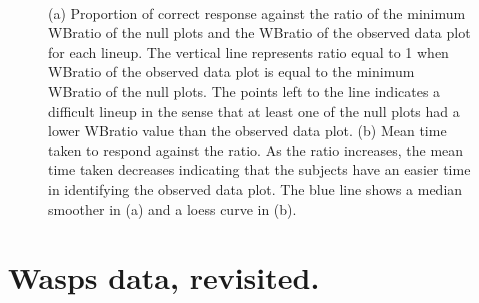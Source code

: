 \begin{figure}[htbp]
\centering
\mbox{\quad
{}}
\caption{(a) Proportion of correct response against the ratio of the minimum WBratio of the null plots and the WBratio of the observed data plot for each lineup. The vertical line represents ratio equal to 1 when WBratio of the observed data plot is equal to the minimum WBratio of the null plots. The points left to the line indicates a difficult lineup in the sense that at least one of the null plots had a lower WBratio value than the observed data plot. (b) Mean time taken to respond against the ratio. As the ratio increases, the mean time taken decreases indicating that the subjects have an easier time in identifying the observed data plot. The blue line shows a median smoother in (a) and a loess curve in (b).} 
\label{null}
\end{figure}




\section{Wasps data, revisited. }

